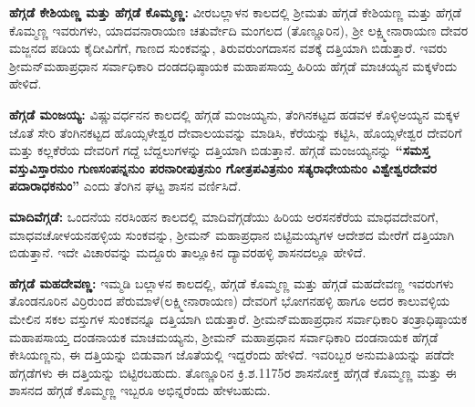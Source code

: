 \textbf{ಹೆಗ್ಗಡೆ ಕೇಶಿಯಣ್ಣ ಮತ್ತು ಹೆಗ್ಗಡೆ ಕೊಮ್ಮಣ್ಣ:} ವೀರಬಲ್ಲಾಳನ ಕಾಲದಲ್ಲಿ ಶ‍್ರೀಮತು ಹೆಗ್ಗಡೆ ಕೇಶಿಯಣ್ಣ ಮತ್ತು ಹೆಗ್ಗಡೆ ಕೊಮ್ಮಣ್ಣ ಇವರುಗಳು, ಯಾದವನಾರಾಯಣ ಚತುರ್ವೇದಿ ಮಂಗಲದ (ತೊಣ್ಣೂರಿನ), ಶ‍್ರೀ ಲಕ್ಷ್ಮೀನಾರಾಯಣ ದೇವರ ಮಜ್ಜನದ ಪಡಿಯ ಕೈದೀವಿಗೆಗೆ, ಗಾಣದ ಸುಂಕವನ್ನು, ತಿರುವರುಂಗದಾಸನ ವಶಕ್ಕೆ ದತ್ತಿಯಾಗಿ ಬಿಡುತ್ತಾರೆ. ಇವರು ಶ‍್ರೀಮನ್​ಮಹಾಪ್ರಧಾನ ಸರ್ವಾಧಿಕಾರಿ ದಂಡದಧಿಷ್ಠಾಯಕ ಮಹಾಪಸಾಯ್ತ ಹಿರಿಯ ಹೆಗ್ಗಡೆ ಮಾಚಯ್ಯನ ಮಕ್ಕಳೆಂದು ಹೇಳಿದೆ.

\textbf{ಹೆಗ್ಗಡೆ ಮಂಜಯ್ಯ:} ವಿಷ್ಣುವರ್ಧನನ ಕಾಲದಲ್ಲಿ ಹೆಗ್ಗಡೆ ಮಂಜಯ್ಯನು, ತೆಂಗಿನಕಟ್ಟದ ಹಡವಳ ಕೊಳ್ಳಿಅಯ್ಯನ ಮಕ್ಕಳ ಜೊತೆ ಸೇರಿ ತೆಂಗಿನಕಟ್ಟದ ಹೊಯ್ಸಳೇಶ್ವರ ದೇವಾಲಯವನ್ನು ಮಾಡಿಸಿ, ಕೆರೆಯನ್ನು ಕಟ್ಟಿಸಿ, ಹೊಯ್ಸಳೇಶ್ವರ ದೇವರಿಗೆ ಮತ್ತು ಕಲ್ಲಕೆರೆಯ ದೇವರಿಗೆ ಗದ್ದೆ ಬೆದ್ದಲುಗಳನ್ನು ದತ್ತಿಯಾಗಿ ಬಿಡುತ್ತಾನೆ. ಹೆಗ್ಗಡೆ ಮಂಜಯ್ಯನನ್ನು \textbf{“ಸಮಸ್ತ ವಸ್ತುವಿಸ್ತಾರನುಂ ಗುಣಸಂಪನ್ನನುಂ ಪರನಾರೀಪುತ್ರನುಂ ಗೋತ್ರಪವಿತ್ರನುಂ ಸತ್ಯರಾಧೇಯನುಂ ವಿಶ್ವೇಶ್ವರದೇವರ ಪದಾರಾಧಕನುಂ”} ಎಂದು ತೆಂಗಿನ ಘಟ್ಟ ಶಾಸನ ವರ್ಣಿಸಿದೆ.

\vskip 2pt

\textbf{ಮಾದಿವೆಗ್ಗಡೆ:} ಒಂದನೆಯ ನರಸಿಂಹನ ಕಾಲದಲ್ಲಿ ಮಾದಿವೆಗ್ಗಡೆಯು ಹಿರಿಯ ಅರಸನಕೆರೆಯ ಮಾಧವದೇವರಿಗೆ, ಮಾಧವಚೋಳಯನಹಳ್ಳಿಯ ಸುಂಕವನ್ನು, ಶ‍್ರೀಮನ್​ ಮಹಾಪ್ರಧಾನ ಬಿಟ್ಟಿಮಯ್ಯಗಳ ಆದೇಶದ ಮೇರೆಗೆ ದತ್ತಿಯಾಗಿ ಬಿಡುತ್ತಾನೆ. ಇದೇ ವಿಚಾರವನ್ನು ಮದ್ದೂರು ತಾಲ್ಲೂಕಿನ ದ್ಯಾವರಹಳ್ಳಿ ಶಾಸನದಲ್ಲೂ ಹೇಳಿದೆ.

\vskip 2pt

\textbf{ಹೆಗ್ಗಡೆ ಮಹದೇವಣ್ಣ:} ಇಮ್ಮಡಿ ಬಲ್ಲಾಳನ ಕಾಲದಲ್ಲಿ, ಹೆಗ್ಗಡೆ ಕೊಮ್ಮಣ್ಣ ಮತ್ತು ಹೆಗ್ಗಡೆ ಮಹದೇವಣ್ಣ ಇವರುಗಳು ತೊಂಡನೂರಿನ ವಿರ್ರಿರುಂದ ಪೆರುಮಾಳೆ(ಲಕ್ಷ್ಮೀನಾರಾಯಣ) ದೇವರಿಗೆ ಭೋಗನಹಳ್ಳಿ ಹಾಗೂ ಅದರ ಕಾಲುವಳ್ಳಿಯ ಮೇಲಿನ ಸಕಲ ವಸ್ತುಗಳ ಸುಂಕವನ್ನೂ ದತ್ತಿಯಾಗಿ ಬಿಡುತ್ತಾರೆ. ಶ‍್ರೀಮನ್​ ಮಹಾಪ್ರಧಾನ ಸರ್ವಾಧಿಕಾರಿ ತಂತ್ರಾಧಿಷ್ಠಾಯಕ ಮಹಾಪಸಾಯ್ತ ದಂಡನಾಯಕ ಮಾಚಮಯ್ಯನು, ಶ‍್ರೀಮನ್​ ಮಹಾಪ್ರಧಾನ ಸರ್ವಾಧಿಕಾರಿ ದಂಡನಾಯಕ ಹೆಗ್ಗಡೆ ಕೇಸಿಯಣ್ಣನು, ಈ ದತ್ತಿಯನ್ನು ಬಿಡುವಾಗ ಜೊತೆಯಲ್ಲಿ ಇದ್ದರೆಂದು ಹೇಳಿದೆ. ಇವರಿಬ್ಬರ ಅನುಮತಿಯನ್ನು ಪಡೆದೇ ಹೆಗ್ಗಡೆಗಳು ಈ ದತ್ತಿಯನ್ನು ಬಿಟ್ಟಿರಬಹುದು. ತೊಣ್ಣೂರಿನ ಕ್ರಿ.ಶ.1175ರ ಶಾಸನೋಕ್ತ ಹೆಗ್ಗಡೆ ಕೊಮ್ಮಣ್ಣ ಮತ್ತು ಈ ಶಾಸನದ ಹೆಗ್ಗಡೆ ಕೊಮ್ಮಣ್ಣ ಇಬ್ಬರೂ ಅಭಿನ್ನರೆಂದು ಹೇಳಬಹುದು.

